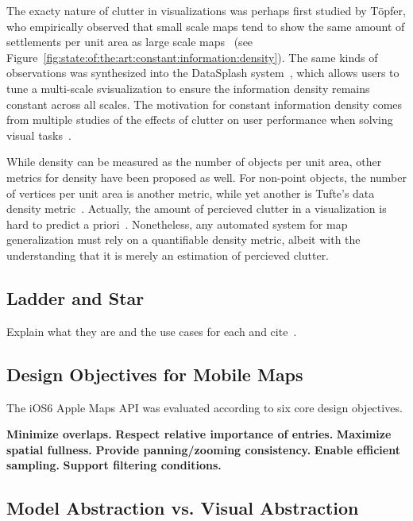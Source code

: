 \documentclass[11pt, oneside]{report}
\newcommand{\minisec}[1]{\noindent\textbf{#1.}}
\begin{document}
{The exacty nature of clutter in visualizations was perhaps first studied by T{\"o}pfer, who empirically observed that small scale maps tend to show the same amount of settlements per unit area as large scale maps~\cite{topfer1966principles} (see Figure~\ref{fig:state:of:the:art:constant:information:density}). The same kinds of observations was synthesized into the DataSplash system~\cite{woodruff1998constant}, which allows users to tune a multi-scale svisualization to ensure the information density remains constant across all scales. The motivation for constant information density comes from multiple studies of the effects of clutter on user performance when solving visual tasks~\cite{phillips1982investigation, springer1987retrieval, tullis1988screen}. 

While density can be measured as the number of objects per unit area, other metrics for density have been proposed as well. For non-point objects, the number of vertices per unit area is another metric, while yet another is Tufte's data density metric~\cite{tufte1983visual}. Actually, the amount of percieved clutter in a visualization is hard to predict a priori~\cite{phillips1982investigation}. Nonetheless, any automated system for map generalization must rely on a quantifiable density metric, albeit with the understanding that it is merely an estimation of percieved clutter.

\subsection{Ladder and Star}

Explain what they are and the use cases for each and cite~\cite{foerster2010challenges,sarma2012fusiontables}.

\subsection{Design Objectives for Mobile Maps}

The iOS6 Apple Maps API was evaluated 	according to six core design objectives.

\minisec{Minimize overlaps}
\minisec{Respect relative importance of entries}
\minisec{Maximize spatial fullness}
\minisec{Provide panning/zooming consistency}
\minisec{Enable efficient sampling}
\minisec{Support filtering conditions}

\subsection{Model Abstraction vs. Visual Abstraction}

}
\end{document}

